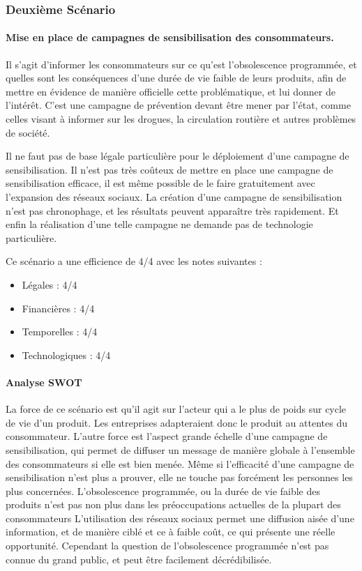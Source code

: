 \subsubsection{Deuxième Scénario}

\paragraph{Mise en place de campagnes de sensibilisation des consommateurs.}

\medbreak
Il s’agit d’informer les consommateurs sur ce qu’est l’obsolescence programmée, et quelles sont les conséquences d’une durée de vie faible de leurs produits, afin de mettre en évidence de manière officielle cette problématique, et lui donner de l'intérêt. C’est une campagne de prévention devant être mener par l’état, comme celles visant à informer sur les drogues, la circulation routière et autres problèmes de société.

\medbreak
Il ne faut pas de base légale particulière pour le déploiement d’une campagne de sensibilisation.
Il n’est pas très coûteux de mettre en place une campagne de sensibilisation efficace, il est même possible de le faire gratuitement avec l'expansion des réseaux sociaux.
La création d’une campagne de sensibilisation n’est pas chronophage, et les résultats peuvent apparaître très rapidement.
Et enfin la réalisation d’une telle campagne ne demande pas de technologie particulière.

Ce scénario a une efficience de 4/4 avec les notes suivantes :
\begin{itemize}
\item Légales : 4/4
\item Financières : 4/4
\item Temporelles : 4/4
\item Technologiques : 4/4
\end{itemize}

\paragraph{Analyse SWOT}

\medbreak
La force de ce scénario est qu’il agit sur l’acteur qui a le plus de poids sur cycle de vie d’un produit. Les entreprises adapteraient donc le produit au attentes du consommateur. L’autre force est l’aspect grande échelle d’une campagne de sensibilisation, qui permet de diffuser un message de manière globale à l’ensemble des consommateurs si elle est bien menée.
\medbreak
Même si l’efficacité d’une campagne de sensibilisation n’est plus a prouver, elle ne touche pas forcément les personnes les plus concernées. L'obsolescence programmée, ou la durée de vie faible des produits n’est pas non plus dans les préoccupations actuelles de la plupart des consommateurs
\medbreak
L’utilisation des réseaux sociaux permet une diffusion aisée d’une information, et de manière ciblé et ce à faible coût, ce qui présente une réelle opportunité.
\medbreak
Cependant la question de l’obsolescence programmée n’est pas connue du grand public, et peut être facilement décrédibilisée.